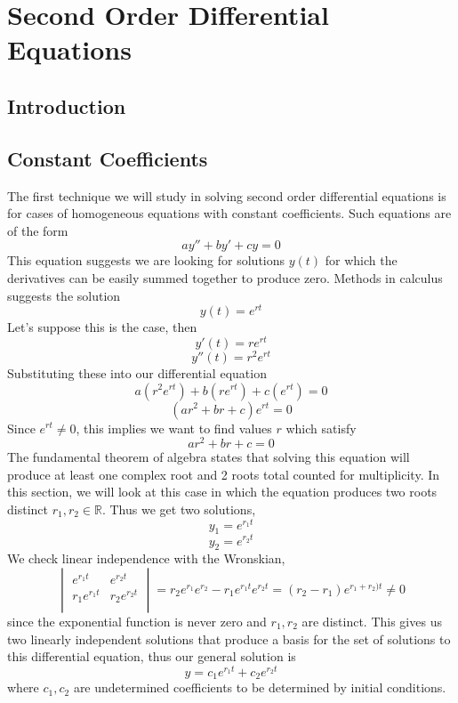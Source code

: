 
\chapter{Second Order Differential Equations}
\setcounter{exercisecounter}{0}

\setcounter{thmcounter}{1}
\section{Introduction}
\section{Constant Coefficients}
The first technique we will study in solving second order differential equations is for cases of homogeneous equations with constant coefficients. Such equations are of the form 
\[ay'' + by' + cy = 0\]
This equation suggests we are looking for solutions $y(t)$ for which the derivatives can be easily summed together to produce zero. Methods in calculus suggests the solution
\[y(t) = e^{rt}\]
Let's suppose this is the case, then
\[y'(t) = re^{rt}\]
\[y''(t) = r^2e^{rt}\]
Substituting these into our differential equation
\[a(r^2e^{rt}) + b(re^{rt}) + c(e^{rt}) = 0\]
\[(ar^2 + br + c)e^{rt} = 0\]
Since $e^{rt} \neq 0$, this implies we want to find values $r$ which satisfy 
\[ar^2 + br + c = 0\]
The fundamental theorem of algebra states that solving this equation will produce at least one complex root and 2 roots total counted for multiplicity. In this section, we will look at this case in which the equation produces two roots distinct $r_1, r_2 \in \mathbb{R}$. Thus we get two solutions, 
\[y_1 = e^{r_1t}\]
\[y_2 = e^{r_2t}\]
We check linear independence with the Wronskian,
\[\begin{vmatrix}
e^{r_1t} & e^{r_2t} \\
r_1e^{r_1t} & r_2e^{r_2t} \\
\end{vmatrix} = r_2e^{r_1}e^{r_2} - r_1e^{r_1t}e^{r_2t} = (r_2-r_1)e^{r_1+r_2)t} \neq 0 \]
since the exponential function is never zero and $r_1, r_2$ are distinct.
This gives us two linearly independent solutions that produce a basis for the set of solutions to this differential equation, thus our general solution is
\[y = c_1e^{r_1t} + c_2e^{r_2t}\]
where $c_1, c_2$ are undetermined coefficients to be determined by initial conditions. 


